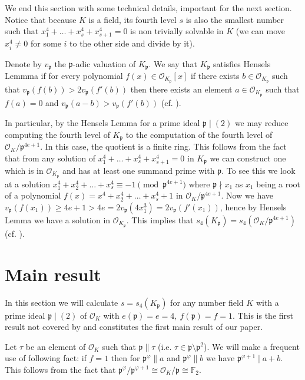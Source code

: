 \documentclass[12pt]{article}
\theoremstyle{remark}
\newcommand{\p}{\mathfrak{p}}
\newcommand{\OO}{\mathcal{O}}
\begin{document}
We end this section with some technical details, important for the next section. Notice that because $K$ is a field, its fourth level $s$ is also the smallest number such that $x_1^4 + \dots + x_s^4 + x_{s+1}^4 = 0$ is non trivially solvable in $K$ (we can move $x_{i}^4 \neq 0$ for some $i$ to the other side and divide by it). 

Denote by $v_\p$ the $\p$-adic valuation of $K_\p$.  We say that $K_\mathfrak{p}$ satisfies Hensels Lemmma if for every polynomial $f(x) \in \OO_{K_\p}[x]$ if there exists $ b \in \OO_{K_\p}$ such that $v_\p(f(b))>2v_\p(f'(b))$ then there exists an element $a \in \OO_{K_\p}$ such that $f(a)=0$ and $v_\p(a-b)>v_\p(f'(b))$ (cf. \cite[Theorem 4.1.3]{ep2005}). 

In particular, by the Hensels Lemma for a prime ideal $\p \mid (2)$ we may reduce computing the fourth level of $K_\p$ to the computation of the fourth level of $\OO_K/\p^{4e+1}$. In this case, the quotient is a finite ring. This follows from the fact that from any solution of $x_1^4 + \dots + x_s^4+x_{s+1}^4=0$ in $K_\p$ we can construct one which is in $\OO_{K_\p}$ and has at least one  summand prime with $\p$. To see this we look at a solution $x_1^4 + x_2^4+ \dots + x_s^4 \equiv -1 \pmod{\p^{4e+1}}$ where $\p \nmid x_1$ as $x_1$ being a root of a polynomial $f(x) = x^4 + x_2^4 + \dots + x_s^4 + 1$ in $\OO_K /\p^{4e+1}$. Now we have $v_\p(f(x_1)) \geq 4e + 1 > 4e = 2v_\p(4x_1^3) = 2v_\p(f'(x_1))$, hence by Hensels Lemma we have a solution in $\OO_{K_\p}$. This implies that $s_4(K_\p) = s_4(\OO_K /\p^{4e+1})$ (cf. \cite{par1981}).








\section{Main result} \label{cef}
In this section we will calculate $s = s_4(K_{\mathfrak{p}})$ for any number field $K$ with a prime ideal $\p \mid (2)$ of $\OO_K$ with $e(\p) = e =4,\ f(\p)=f=1$. This is the first result not covered by \cite{paper-per-piotr} and constitutes the first main result of our paper.

Let $\tau$ be an element of $\mathcal{O}_K$ such that $\mathfrak{p} \parallel \tau$ (i.e. $\tau \in \mathfrak{p} \setminus \mathfrak{p}^2 $). We will make a frequent use of following fact: if $f=1$ then for $\mathfrak{p}^{\varphi} \parallel a$ and $\mathfrak{p}^{\varphi} \parallel b$ we have $\mathfrak{p}^{\varphi+1} \mid a+b$. This follows from the fact that $\mathfrak{p}^{\varphi}/\mathfrak{p}^{\varphi+1} \cong \mathcal{O}_K/\mathfrak{p} \cong \mathbb{F}_2$.
\end{document}
